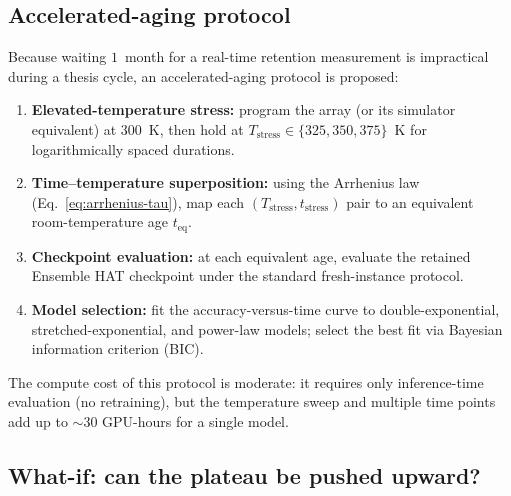 \subsection{Accelerated-aging protocol}

Because waiting $1$~month for a real-time retention measurement is impractical during a thesis cycle, an accelerated-aging protocol is proposed:
\begin{enumerate}
    \item \textbf{Elevated-temperature stress:} program the array (or its simulator equivalent) at $300$~K, then hold at $T_{\text{stress}} \in \{325, 350, 375\}$~K for logarithmically spaced durations.
    \item \textbf{Time--temperature superposition:} using the Arrhenius law (Eq.~\ref{eq:arrhenius-tau}), map each $(T_{\text{stress}}, t_{\text{stress}})$ pair to an equivalent room-temperature age $t_{\text{eq}}$.
    \item \textbf{Checkpoint evaluation:} at each equivalent age, evaluate the retained Ensemble HAT checkpoint under the standard fresh-instance protocol.
    \item \textbf{Model selection:} fit the accuracy-versus-time curve to double-exponential, stretched-exponential, and power-law models; select the best fit via Bayesian information criterion (BIC).
\end{enumerate}

The compute cost of this protocol is moderate: it requires only inference-time evaluation (no retraining), but the temperature sweep and multiple time points add up to $\sim$30 GPU-hours for a single model.

\subsection{What-if: can the plateau be pushed upward?}

